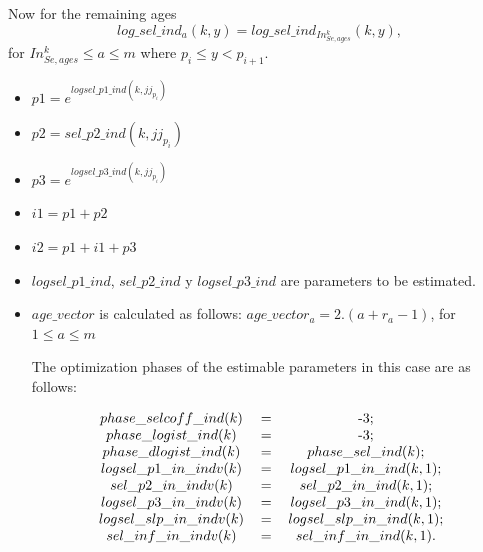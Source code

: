 \documentclass{article}
\begin{document}
\begin{itemize}
    Now for the remaining ages
    \begin{equation}
         log\_sel\_ind_a(k,y) = log\_sel\_ind_{In_{Se,ages}^k}(k,y),
    \end{equation}
    for $In_{Se,ages}^k\leq a \leq m$ where $p_i\leq y < p_{i+1}$.
\begin{itemize}
    \item $p1 = e^{logsel\_p1\_ind(k,jj_{p_i})}$
    \item $p2 = sel\_p2\_ind(k,jj_{p_i})$
    \item $p3 = e^{logsel\_p3\_ind(k,jj_{p_i})}$
    \item $i1 = p1 + p2$
    \item $i2 = p1 + i1 + p3$
    \item $logsel\_p1\_ind$, $sel\_p2\_ind$ y $logsel\_p3\_ind$ are parameters to be estimated.
    \item $age\_vector$ is calculated as follows: $age\_vector_a=2.(a+r_a-1)$, for $1\leq a \leq m$ %
    
    The optimization phases of the estimable parameters in this case are as follows:
\begin{table}[H]
    \centering
    \begin{equation}
    \begin{tabular}{c c c}
         $phase\_selcoff\_ind(k)$& =& -3;\\
        $phase\_logist\_ind(k)$ &= &-3;\\
        $phase\_dlogist\_ind(k)$ & = & $phase\_sel\_ind(k)$;\\
        
        $logsel\_p1\_in\_indv(k)$& = &$logsel\_p1\_in\_ind(k,1)$;\\
        $sel\_p2\_in\_indv(k)$ &= &   $sel\_p2\_in\_ind(k,1)$;\\
        $logsel\_p3\_in\_indv(k)$ &= &$logsel\_p3\_in\_ind(k,1)$;\\

        $logsel\_slp\_in\_indv(k)$ &= &$logsel\_slp\_in\_ind(k,1)$;\\
        $sel\_inf\_in\_indv(k)$& =   & $sel\_inf\_in\_ind(k,1)$.
    \end{tabular}
    \end{equation}
    \label{tab: phase6}
\end{table}
\end{itemize}

\end{itemize}
\end{document}
